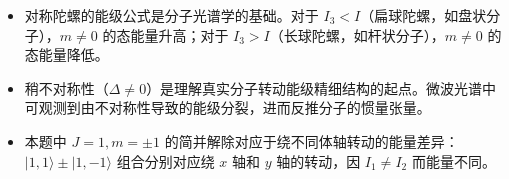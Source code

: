 \begin{insightbox}[物理图像]
\begin{itemize}
    \item 对称陀螺的能级公式是分子光谱学的基础。对于 $I_3<I$（扁球陀螺，如盘状分子），$m\neq0$ 的态能量升高；对于 $I_3>I$（长球陀螺，如杆状分子），$m\neq0$ 的态能量降低。
    \item 稍不对称性（$\Delta\neq0$）是理解真实分子转动能级精细结构的起点。微波光谱中可观测到由不对称性导致的能级分裂，进而反推分子的惯量张量。
    \item 本题中 $J=1,m=\pm1$ 的简并解除对应于绕不同体轴转动的能量差异：$|1,1\rangle\pm|1,-1\rangle$ 组合分别对应绕 $x$ 轴和 $y$ 轴的转动，因 $I_1\neq I_2$ 而能量不同。
\end{itemize}
\end{insightbox}
